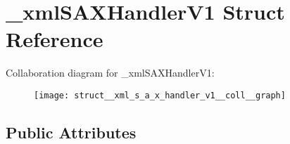 \hypertarget{struct__xml_s_a_x_handler_v1}{\section{\-\_\-xml\-S\-A\-X\-Handler\-V1 Struct Reference}
\label{struct__xml_s_a_x_handler_v1}
}


Collaboration diagram for \-\_\-xml\-S\-A\-X\-Handler\-V1\-:
\nopagebreak
\begin{figure}[H]
\begin{center}
\leavevmode
\texttt{[image: struct\_\_xml\_s\_a\_x\_handler\_v1\_\_coll\_\_graph]}
\end{center}
\end{figure}
\subsection*{Public Attributes}
